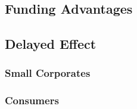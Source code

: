 

\subsection{Funding Advantages \label{sec:taxpayers}}

\subsection{Delayed Effect \label{sec:taxpayers}}

\subsubsection{Small Corporates\label{sec:smallCorporates}}


\subsubsection{Consumers \label{sec:consumers}}